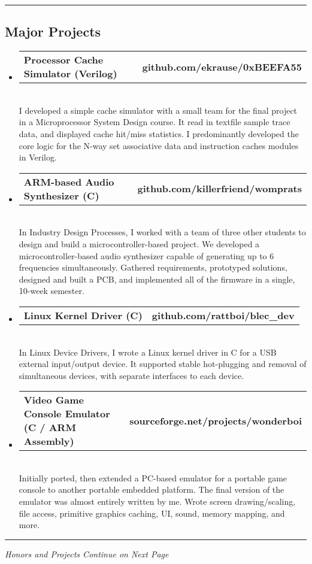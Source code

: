\documentclass[10pt,letterpaper]{article}
\makeatletter
\newcommand{\headerrow}[2]
{\begin{tabular*}{\linewidth}{l@{\extracolsep{\fill}}r}
	#1 &
	#2 \\
\end{tabular*}}
\makeatother
\begin{document}
\hrule
\vspace{-0.4em}
\subsection*{Major Projects}
\begin{itemize}
  \item 
  \headerrow 
  {\textbf{Processor Cache Simulator (Verilog)}}
  {\textbf{github.com/ekrause/0xBEEFA55}}
  \\
  I developed a simple cache simulator with a small team for the final project in a Microprocessor System Design course. It read in textfile sample trace data, and displayed cache hit/miss statistics. I predominantly developed the core logic for the N-way set associative data and instruction caches modules in Verilog.
  \item 
  \headerrow 
  {\textbf{ARM-based Audio Synthesizer (C)}}
  {\textbf{github.com/killerfriend/womprats}}
  \\
  In Industry Design Processes, I worked with a team of three other students to design and build a microcontroller-based project. We developed a microcontroller-based audio synthesizer capable of generating up to 6 frequencies simultaneously. Gathered requirements, prototyped solutions, designed and built a PCB, and implemented all of the firmware in a single, 10-week semester. 
  \item 
  \headerrow 
  {\textbf{Linux Kernel Driver (C)}}
  {\textbf{github.com/rattboi/blec\_dev}}
  \\
  In Linux Device Drivers, I wrote a Linux kernel driver in C for a USB external input/output device. It supported stable hot-plugging and removal of simultaneous devices, with separate interfaces to each device.
  \item 
  \headerrow 
  {\textbf{Video Game Console Emulator (C / ARM Assembly)}}
  {\textbf{sourceforge.net/projects/wonderboi}}
  \\
  Initially ported, then extended a PC-based emulator for a portable game console to another portable embedded platform. The final version of the emulator was almost entirely written by me. Wrote screen drawing/scaling, file access, primitive graphics caching, UI, sound, memory mapping, and more.
\end{itemize}

\hrule
\begin{center}
{\emph{Honors and Projects Continue on Next Page}}

\end{center}
\end{document}
